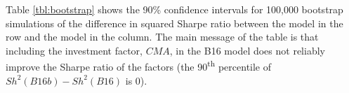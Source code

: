 
Table \ref{tbl:bootstrap} shows the 90\% confidence intervals for 100,000 bootstrap
simulations of the difference in squared Sharpe ratio between the model in the row and the
model in the column. The main message of the table is that including the investment
factor, $CMA$, in the B16 model does not reliably improve the Sharpe ratio of the factors
(the 90\textsuperscript{th} percentile of $Sh^2(B16b)-Sh^2(B16)$ is 0).


